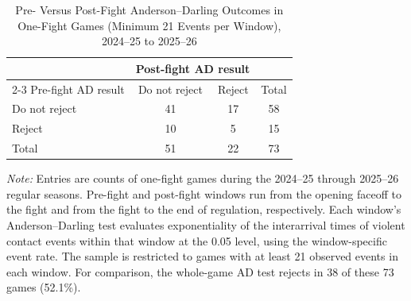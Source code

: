 \begin{table}[htbp]
\centering
\caption{Pre- Versus Post-Fight Anderson--Darling Outcomes in One-Fight Games (Minimum 21 Events per Window), 2024--25 to 2025--26}
\label{tab:one_fight_AD_rejection_min_21_20242025_20252026}
\small
\renewcommand{\arraystretch}{1.15}
\setlength{\tabcolsep}{6pt}

\begin{tabular*}{0.78\textwidth}{@{\extracolsep{\fill}}lccc}
\toprule
 & \multicolumn{2}{c}{Post-fight AD result} & \\
\cmidrule(lr){2-3}
Pre-fight AD result & Do not reject & Reject & Total \\
\midrule
Do not reject & 41 & 17 & 58 \\
Reject & 10 & 5 & 15 \\
\midrule
Total & 51 & 22 & 73 \\
\bottomrule
\end{tabular*}

\vspace{0.4em}
\parbox{0.78\textwidth}{
\footnotesize
\textit{Note:} Entries are counts of one-fight games during the 2024--25 through 2025--26 regular seasons. Pre-fight and post-fight windows run from the opening faceoff to the fight and from the fight to the end of regulation, respectively. Each window's Anderson--Darling test evaluates exponentiality of the interarrival times of violent contact events within that window at the 0.05 level, using the window-specific event rate. The sample is restricted to games with at least 21 observed events in each window. For comparison, the whole-game AD test rejects in 38 of these 73 games (52.1\%).
}
\end{table}
